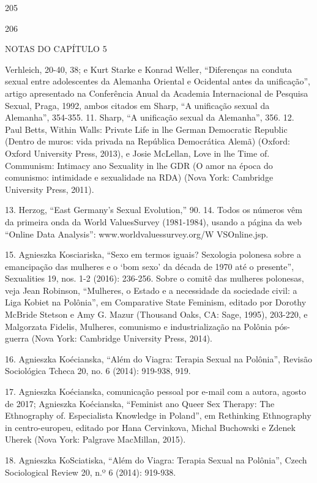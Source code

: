  \par 
205
 \par 
206
 \par 
NOTAS DO CAPÍTULO {\color{blue}5}
 \par 
Verhleich, 20-40, 38; e Kurt Starke e Konrad Weller, “Diferenças na conduta sexual entre adolescentes da Alemanha Oriental e Ocidental antes da unificação”, artigo apresentado na Conferência Anual da Academia Internacional de Pesquisa Sexual, Praga, 1992, ambos citados em Sharp, “A unificação sexual da Alemanha”, 354-355. {\color{blue}11}. Sharp, “A unificação sexual da Alemanha”, {\color{blue}356}. {\color{blue}12}. Paul Betts, Within Walls: Private Life in lhe German Democratic Republic (Dentro de muros: vida privada na República Democrática Alemã) (Oxford: Oxford University Press, 2013), e Josie McLellan, Love in lhe Time of. Communism: Intimacy ano Sexuality in lhe GDR (O amor na época do comunismo: intimidade e sexualidade na RDA) (Nova York: Cambridge University Press, 2011).
 \par 
13. Herzog, “East Germany’s Sexual Evolution,” {\color{blue}90}. {\color{blue}14}. Todos os números vêm da primeira onda da World Values ​​Survey (1981-1984), usando a página da web “Online Data Analysis”: www.worldvaluessurvey.org/W VSOnline.jsp.
 \par 
15. Agnieszka Kosciariska, “Sexo em termos iguais? Sexologia polonesa sobre a emancipação das mulheres e o ‘bom sexo’ da década de 1970 até o presente”, Sexualities 19, nos. 1-2 (2016): 236-256. Sobre o comitê das mulheres polonesas, veja Jean Robinson, “Mulheres, o Estado e a necessidade da sociedade civil: a Liga Kobiet na Polônia”, em Comparative State Feminism, editado por Dorothy McBride Stetson e Amy G. Mazur (Thousand Oaks, CA: Sage, 1995), 203-220, e Malgorzata Fidelis, Mulheres, comunismo e industrialização na Polônia pós-guerra (Nova York: Cambridge University Press, 2014).
 \par 
16. Agnieszka Koécianska, “Além do Viagra: Terapia Sexual na Polônia”, Revisão Sociológica Tcheca 20, no. {\color{blue}6} (2014): 919-938, {\color{blue}919}.
 \par 
17. Agnieszka Koécianska, comunicação pessoal por e-mail com a autora, agosto de 2017; Agnieszka Koécianska, “Feminist ano Queer Sex Therapy: The Ethnography of. Especialista Knowledge in Poland”, em Rethinking Ethnography in centro-europeu, editado por Hana Cervinkova, Michal Buchowski e Zdenek Uherek (Nova York: Palgrave MacMillan, 2015).
 \par 
18. Agnieszka KoSciatiska, “Além do Viagra: Terapia Sexual na Polônia”, Czech Sociological Review 20, n.º {\color{blue}6} (2014): 919-938.
